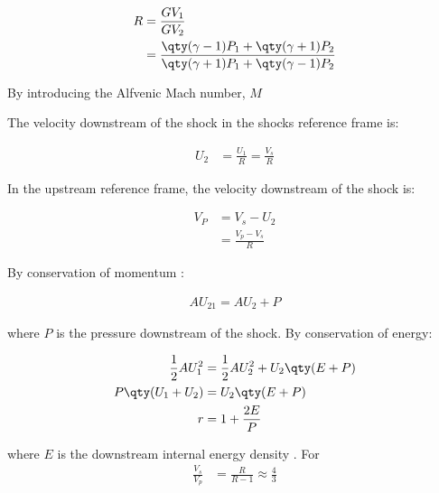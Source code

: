 \begin{equation}
    \begin{aligned}
        R&=\frac{GV_1}{GV_2} \\
        &=\frac{\qty(\gamma-1)P_1+\qty(\gamma+1)P_2}{\qty(\gamma+1)P_1+\qty(\gamma-1)P_2}
    \end{aligned}
\end{equation}

By introducing the Alfvenic Mach number, $M$


The velocity downstream of the shock in the shocks reference frame is:

\begin{equation}
    \begin{aligned}
        U_2&=\frac{U_1}{R}=\frac{V_s}{R}
    \end{aligned}
\end{equation}

\noindent In the upstream reference frame, the velocity downstream of the shock is:

\begin{equation}
    \begin{aligned}
        V_P&=V_s-U_2 \\
        &=\frac{V_p-V_s}{R}
    \end{aligned}
\end{equation}

\noindent By conservation of momentum \citep{1983RPPh...46..973D}:

\begin{equation}
    \begin{aligned}
        AU_21=AU_2+P
    \end{aligned}
\end{equation}

\noindent where $P$ is the pressure downstream of the shock. By conservation of energy:

\begin{equation}
    \begin{aligned}
        \frac{1}{2}AU_1^2&=\frac{1}{2}AU_2^2+U_2\qty(E+P) \\
        P\qty(U_1+U_2)&=U_2\qty(E+P) \\
        r&=1+\frac{2E}{P}
    \end{aligned}
\end{equation}

\noindent where $E$ is the downstream internal energy density \citep{1983RPPh...46..973D}. For 
\begin{equation}
    \begin{aligned}
    \frac{V_s}{V_p}&=\frac{R}{R-1}\approx \frac{4}{3}
    \end{aligned}
\end{equation}

